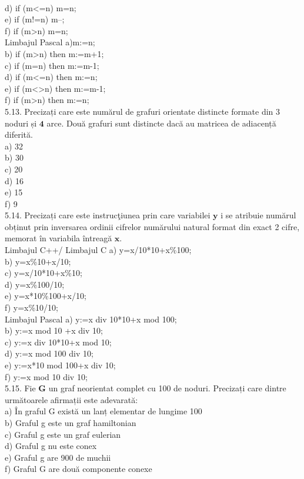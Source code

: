 \\
d) if (m<=n) m=n;
\\
e) if (m!=n) m--;
\\
f) if (m>n) m=n;
\\
Limbajul Pascal
a)m:=n;
\\
b) if (m>n) then m:=m+1;
\\
c) if (m=n) then m:=m-1;
\\
d) if (m<=n) then m:=n;
\\
e) if (m<>n) then m:=m-1;
\\
f) if (m>n) then m:=n;
\\
5.13. Precizați care este numărul de grafuri orientate distincte formate din 3 noduri și $\mathbf{4}$ arce. Două grafuri sunt distincte dacă au matricea de adiacență diferită.
\\
a) 32
\\
b) 30
\\
c) 20
\\
d) 16
\\
e) 15
\\
f) 9
\\
5.14. Precizați care este instrucţiunea prin care variabilei $\mathbf{y}$ i se atribuie numărul obținut prin inversarea ordinii cifrelor numărului natural format din exact 2 cifre, memorat în variabila întreagă $\mathbf{x}$.
\\
Limbajul C++/ Limbajul C
a) y=x/10*10+x\%100;
\\
b)  y=x\%10+x/10;
\\
c)  y=x/10*10+x\%10;
\\ 
d)  y=x\%100/10;
\\
e)  y=x*10\%100+x/10;
\\ 
f)  y=x\%10/10;
\\
Limbajul Pascal
a)  y:=x div 10*10+x mod 100;
\\
b)  y:=x mod 10 +x div 10;
\\
c)  y:=x div 10*10+x mod 10;
\\
d)  y:=x mod 100 div 10;
\\
e)  y:=x*10 mod 100+x div 10;
\\
f)  y:=x mod 10 div 10;
\\
5.15. Fie $\mathbf{G}$ un graf neorientat complet cu 100 de noduri. Precizați care dintre următoarele afirmații este adevarată:
\\
a) În graful G există un lanț elementar de lungime 100
\\
b) Graful g este un graf hamiltonian
\\
c) Graful g este un graf eulerian
\\
d) Graful g nu este conex
\\
e) Graful g are 900 de muchii
\\
f) Graful G are două componente conexe
\\

